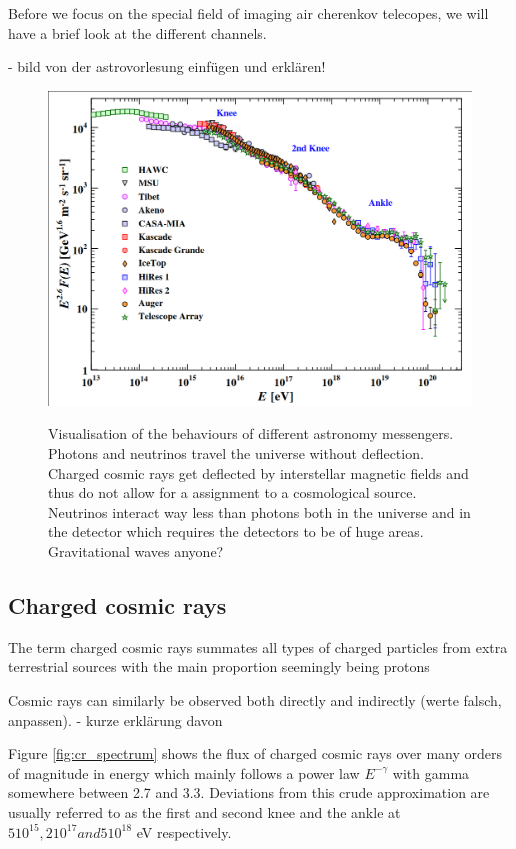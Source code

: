 Before we focus on the special field of imaging air cherenkov telecopes, we will have
a brief look at the different channels.

- bild von der astrovorlesung einfügen und erklären!
\begin{figure}
	\includegraphics[width=.8\textwidth]{images/cr_spectrum.png}
	\label{fig:multi_messenger}
	\caption{Visualisation of the behaviours of different astronomy messengers. Photons and neutrinos 
		travel the universe without deflection. Charged cosmic rays get deflected by interstellar
		magnetic fields and thus do not allow for a assignment to a cosmological source.
		Neutrinos interact way less than photons both in the universe and in the detector 
		which requires the detectors to be of huge areas. Gravitational waves anyone?
	}
\end{figure}


\subsection{Charged cosmic rays}
The term charged cosmic rays summates all types of charged particles from
extra terrestrial sources with the main proportion seemingly being protons
\cite{something something}


Cosmic rays can similarly be observed both directly and indirectly (werte falsch, anpassen).
- kurze erklärung davon


Figure \ref{fig:cr_spectrum} shows the flux of charged cosmic rays over 
many orders of magnitude in energy which mainly follows 
a power law $E^{-\gamma}$ with gamma somewhere between 
2.7 and 3.3. Deviations from this crude approximation are 
usually referred to as the first and second knee and the ankle 
at $5 10^{15}, 2 10^{17} and 5 10^{18}$ eV respectively.

